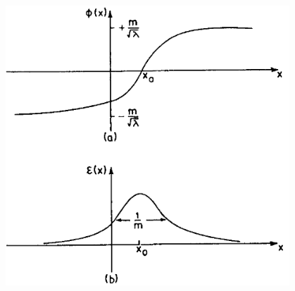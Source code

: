 \documentclass[handout]{beamer}
\begin{document}
\begin{frame}
\begin{columns}[T]
\begin{column}[T]{.6\linewidth}
 \end{column}
 \begin{column}[T]{.4\linewidth}
\begin{figure}
\includegraphics[scale=0.3]{kink_energie.png}
\end{figure}
 \end{column}
\end{columns}
  \end{frame}
\end{document}
